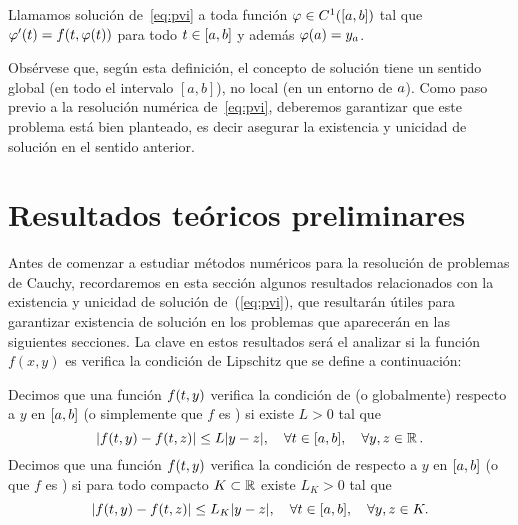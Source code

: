 \begin{definition}
  Llamamos solución de~\eqref{eq:pvi} a toda función $\sol\in
  C^1([\ta,\tb])$ tal que $\sol'(\tt)=f(\tt,\sol(\tt))$ para todo
  $\tt\in[\ta,\tb]$ y además $\sol(\ta)=\ycero$.\label{def:3}
\end{definition}

Obsérvese que, según esta definición, el concepto de solución tiene un
sentido global (en todo el intervalo $[a,b]$), no local (en un entorno
de $\ta$). Como paso previo a la resolución numérica
de~\eqref{eq:pvi}, deberemos garantizar que este problema está bien
planteado, es decir asegurar la existencia y unicidad de solución en
el sentido anterior.

\section{Resultados teóricos preliminares}
\label{sec:tema4:resultados-teoricos}

Antes de comenzar a estudiar métodos numéricos para la resolución de
problemas de Cauchy, recordaremos en esta sección algunos
resultados relacionados con la existencia y unicidad de solución
de~(\ref{eq:pvi}), que resultarán útiles para garantizar existencia de
solución en los problemas que aparecerán en las siguientes secciones.
La clave en estos resultados será el analizar si la función $f(x,y)$
es verifica la condición de Lipschitz que se define a continuación:

\begin{definition}
  \label{def:lipschitz}
  Decimos que una función $f(\tt,y)$ verifica la condición de
   (o globalmente) respecto a $y$ en
    $[\ta,\tb]$ (o simplemente que $f$ es \globLipschitz)
    si existe $L>0$ tal que
  \begin{equation*}
    |f(\tt,y) - f(\tt,z)| \le L |y-z|, \quad \forall \tt\in [\ta,\tb],
    \quad  \forall y,z\in \Rset.
  \end{equation*}
  Decimos que una función $f(\tt,y)$ verifica la condición de
   respecto a $y$ en
  $[\ta,\tb]$ (o que $f$ es \locLipschitz) si para todo compacto
  $K\subset\Rset$ existe $L_K>0$ tal que
  \begin{equation*}
    |f(\tt,y) - f(\tt,z)| \le L_K |y-z|, \quad \forall \tt\in [\ta,\tb],
    \quad  \forall y,z\in K.
  \end{equation*}
\end{definition}

